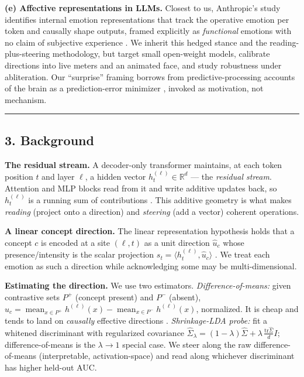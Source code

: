 \documentclass[
]{article}
\begin{document}
\textbf{(e) Affective representations in LLMs.} Closest to us,
Anthropic's study identifies internal emotion representations that track
the operative emotion per token and causally shape outputs, framed
explicitly as \emph{functional} emotions with no claim of subjective
experience \citep{sofroniew2026emotion}. We inherit this hedged stance
and the reading-plus-steering methodology, but target small open-weight
models, calibrate directions into live meters and an animated face, and
study robustness under abliteration. Our ``surprise'' framing borrows
from predictive-processing accounts of the brain as a prediction-error
minimizer \citep{clark2013predictive, friston2010freeenergy}, invoked as
motivation, not mechanism.

\begin{center}\rule{0.5\linewidth}{0.5pt}\end{center}

\subsection{3. Background}\label{background}

\textbf{The residual stream.} A decoder-only transformer maintains, at
each token position \(t\) and layer \(\ell\), a hidden vector
\(h^{(\ell)}_t \in \mathbb{R}^d\) --- the \emph{residual stream}.
Attention and MLP blocks read from it and write additive updates back,
so \(h^{(\ell)}_t\) is a running sum of contributions
\citep{elhage2022toy}. This additive geometry is what makes
\emph{reading} (project onto a direction) and \emph{steering} (add a
vector) coherent operations.

\textbf{A linear concept direction.} The linear representation
hypothesis holds that a concept \(c\) is encoded at a site \((\ell,t)\)
as a unit direction \(\hat u_c\) whose presence/intensity is the scalar
projection \(s_t = \langle h^{(\ell)}_t, \hat u_c\rangle\)
\citep{park2024linear}. We treat each emotion as such a direction while
acknowledging some may be multi-dimensional.

\textbf{Estimating the direction.} We use two estimators.
\emph{Difference-of-means:} given contrastive sets \(P^+\) (concept
present) and \(P^-\) (absent),
\(u_c = \operatorname{mean}_{x\in P^+} h^{(\ell)}(x) - \operatorname{mean}_{x\in P^-} h^{(\ell)}(x)\),
normalized. It is cheap and tends to land on \emph{causally} effective
directions \citep{marks2024geometry, rimsky2024caa}. \emph{Shrinkage-LDA
probe:} fit a whitened discriminant with regularized covariance
\(\hat\Sigma_\lambda = (1-\lambda)\hat\Sigma + \lambda\,\tfrac{\mathrm{tr}
\hat\Sigma}{d} I\); difference-of-means is the \(\lambda\to 1\) special
case. We steer along the raw difference-of-means (interpretable,
activation-space) and read along whichever discriminant has higher
held-out AUC.
\end{document}
